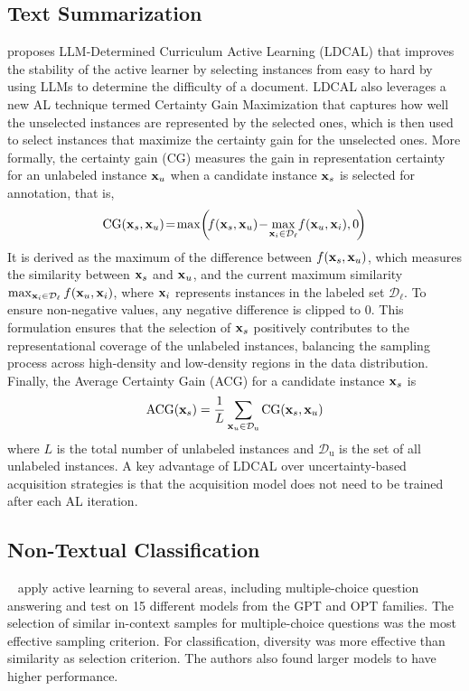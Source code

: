 \subsection{Text Summarization}\label{apps-text-summarization}

\citet{li2024active} proposes LLM-Determined Curriculum Active Learning (LDCAL) that improves the stability of the active learner by selecting instances from easy to hard by using LLMs to determine the difficulty of a document. LDCAL also leverages a new AL technique termed Certainty Gain Maximization that captures how well the unselected instances are represented by the selected ones, which is then used to select instances that maximize the certainty gain for the unselected ones.
More formally, the certainty gain (CG) measures the gain in representation certainty for an unlabeled instance $\boldsymbol{\mathrm{x}}_u$ when a candidate instance $\boldsymbol{\mathrm{x}}_s$ is selected for annotation, that is,
\begin{align}
\text{CG}(\vx_{s}, \vx_{u}) \!= \!\max \!\left(\! f(\vx_{s}, \vx_u) \!- \!\max_{\vx_{i} \in \mathcal{D}_{\ell}} \!f(\vx_{u}, \vx_{i}), 0 \!\right)\nonumber
\end{align}
It is derived as the maximum of the difference between $f(\boldsymbol{\mathrm{x}}_s, \boldsymbol{\mathrm{x}}_u)$, which measures the similarity between $\boldsymbol{\mathrm{x}}_s$ and $\boldsymbol{\mathrm{x}}_u$, and the current maximum similarity $\max_{\boldsymbol{\mathrm{x}}_i \in \mathcal{D}_\ell} f(\boldsymbol{\mathrm{x}}_u, \boldsymbol{\mathrm{x}}_i)$, where $\boldsymbol{\mathrm{x}}_i$ represents instances in the labeled set $\mathcal{D}_\ell$. To ensure non-negative values, any negative difference is clipped to 0. This formulation ensures that the selection of $\boldsymbol{\mathrm{x}}_s$ positively contributes to the representational coverage of the unlabeled instances, balancing the sampling process across high-density and low-density regions in the data distribution.
Finally, the Average Certainty Gain (ACG) for a candidate instance $\boldsymbol{\mathrm{x}}_s$ is
\[
\text{ACG}(\boldsymbol{\mathrm{x}}_s) = \frac{1}{L} \sum_{\boldsymbol{\mathrm{x}}_u \in \mathcal{D}_{\text{u}}} \text{CG}(\boldsymbol{\mathrm{x}}_s, \boldsymbol{\mathrm{x}}_u)
\]
where $L$ is the total number of unlabeled instances and $\mathcal{D}_{\text{u}}$ is the set of all unlabeled instances.
A key advantage of LDCAL over uncertainty-based acquisition strategies is that the acquisition model does not need to be trained after each AL iteration.


\subsection{Non-Textual Classification}\label{apps-non-text-classification}
~\citet{margatina2023active} apply active learning to several areas, including multiple-choice question answering and test on 15 different models from the GPT and OPT families. The selection of similar in-context samples for multiple-choice questions was the most effective sampling criterion. For classification, diversity was more effective than similarity as selection criterion. The authors also found larger models to have higher performance.

